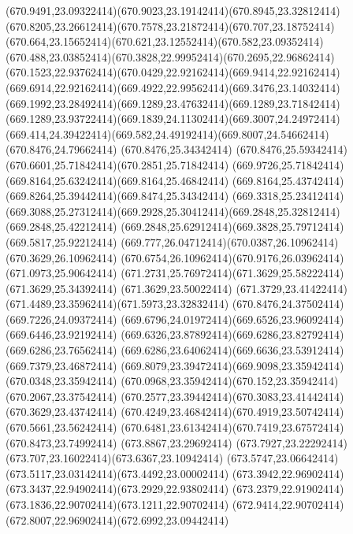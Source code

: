 {{	\curveto(670.9491,23.09322414)(670.9023,23.19142414)(670.8945,23.32812414)
	\curveto(670.8205,23.26612414)(670.7578,23.21872414)(670.707,23.18752414)
	\curveto(670.664,23.15652414)(670.621,23.12552414)(670.582,23.09352414)
	\curveto(670.488,23.03852414)(670.3828,22.99952414)(670.2695,22.96862414)
	\curveto(670.1523,22.93762414)(670.0429,22.92162414)(669.9414,22.92162414)
	\curveto(669.6914,22.92162414)(669.4922,22.99562414)(669.3476,23.14032414)
	\curveto(669.1992,23.28492414)(669.1289,23.47632414)(669.1289,23.71842414)
	\curveto(669.1289,23.93722414)(669.1839,24.11302414)(669.3007,24.24972414)
	\curveto(669.414,24.39422414)(669.582,24.49192414)(669.8007,24.54662414)
	\lineto(670.8476,24.79662414)
	\lineto(670.8476,25.34342414)
	\curveto(670.8476,25.59342414)(670.6601,25.71842414)(670.2851,25.71842414)
	\curveto(669.9726,25.71842414)(669.8164,25.63242414)(669.8164,25.46842414)
	\curveto(669.8164,25.43742414)(669.8264,25.39442414)(669.8474,25.34342414)
	\lineto(669.3318,25.23412414)
	\curveto(669.3088,25.27312414)(669.2928,25.30412414)(669.2848,25.32812414)
	\lineto(669.2848,25.42212414)
	\curveto(669.2848,25.62912414)(669.3828,25.79712414)(669.5817,25.92212414)
	\curveto(669.777,26.04712414)(670.0387,26.10962414)(670.3629,26.10962414)
	\curveto(670.6754,26.10962414)(670.9176,26.03962414)(671.0973,25.90642414)
	\curveto(671.2731,25.76972414)(671.3629,25.58222414)(671.3629,25.34392414)
	\lineto(671.3629,23.50022414)
	\curveto(671.3729,23.41422414)(671.4489,23.35962414)(671.5973,23.32832414)
	\closepath
	\moveto(670.8476,24.37502414)
	\lineto(669.7226,24.09372414)
	\curveto(669.6796,24.01972414)(669.6526,23.96092414)(669.6446,23.92192414)
	\curveto(669.6326,23.87892414)(669.6286,23.82792414)(669.6286,23.76562414)
	\curveto(669.6286,23.64062414)(669.6636,23.53912414)(669.7379,23.46872414)
	\curveto(669.8079,23.39472414)(669.9098,23.35942414)(670.0348,23.35942414)
	\curveto(670.0968,23.35942414)(670.152,23.35942414)(670.2067,23.37542414)
	\curveto(670.2577,23.39442414)(670.3083,23.41442414)(670.3629,23.43742414)
	\curveto(670.4249,23.46842414)(670.4919,23.50742414)(670.5661,23.56242414)
	\curveto(670.6481,23.61342414)(670.7419,23.67572414)(670.8473,23.74992414)
	\closepath
	\moveto(673.8867,23.29692414)
	\curveto(673.7927,23.22292414)(673.707,23.16022414)(673.6367,23.10942414)
	\curveto(673.5747,23.06642414)(673.5117,23.03142414)(673.4492,23.00002414)
	\curveto(673.3942,22.96902414)(673.3437,22.94902414)(673.2929,22.93802414)
	\curveto(673.2379,22.91902414)(673.1836,22.90702414)(673.1211,22.90702414)
	\curveto(672.9414,22.90702414)(672.8007,22.96902414)(672.6992,23.09442414)
}}
